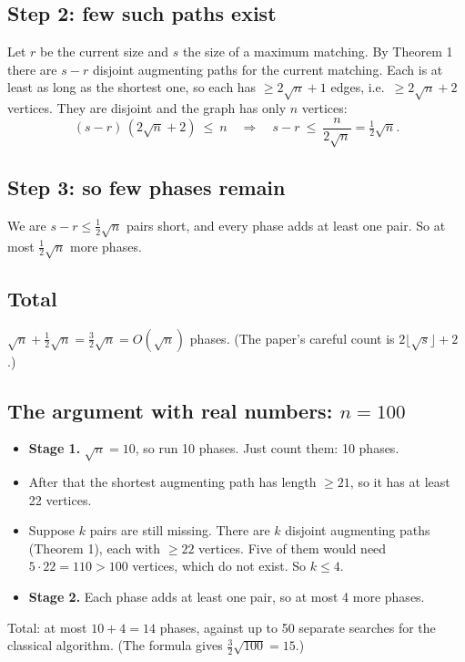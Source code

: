 \documentclass[11pt,a4paper]{article}
\begin{document}
\subsection*{Step 2: few such paths exist}
Let $r$ be the current size and $s$ the size of a maximum matching. By Theorem 1 there are $s-r$ disjoint augmenting paths for the current matching. Each is at least as long as the shortest one, so each has $\ge2\sqrt n+1$ edges, i.e.\ $\ge2\sqrt n+2$ vertices. They are disjoint and the graph has only $n$ vertices:
\[
(s-r)\,(2\sqrt n+2)\ \le\ n\quad\Longrightarrow\quad s-r\ \le\ \frac{n}{2\sqrt n}=\tfrac12\sqrt n .
\]
\begin{center}
\end{center}

\subsection*{Step 3: so few phases remain}
We are $s-r\le\tfrac12\sqrt n$ pairs short, and every phase adds at least one pair. So at most $\tfrac12\sqrt n$ more phases.

\subsection*{Total}
$\sqrt n+\tfrac12\sqrt n=\tfrac32\sqrt n=O(\sqrt n)$ phases. (The paper's careful count is $2\lfloor\sqrt s\rfloor+2$.)

\subsection*{The argument with real numbers: $n=100$}
\begin{itemize}
  \item \textbf{Stage 1.} $\sqrt n=10$, so run 10 phases. Just count them: 10 phases.
  \item After that the shortest augmenting path has length $\ge21$, so it has at least 22 vertices.
  \item Suppose $k$ pairs are still missing. There are $k$ disjoint augmenting paths (Theorem 1), each with $\ge22$ vertices. Five of them would need $5\cdot22=110>100$ vertices, which do not exist. So $k\le4$.
  \item \textbf{Stage 2.} Each phase adds at least one pair, so at most 4 more phases.
\end{itemize}
Total: at most $10+4=14$ phases, against up to 50 separate searches for the classical algorithm. (The formula gives $\frac32\sqrt{100}=15$.)
\end{document}
